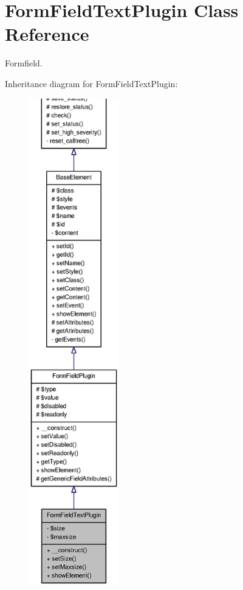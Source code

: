\section{FormFieldTextPlugin Class Reference}
\label{classFormFieldTextPlugin}


Formfield.  




Inheritance diagram for FormFieldTextPlugin:\nopagebreak
\begin{figure}[H]
\begin{center}
\leavevmode
\includegraphics[height=600pt]{classFormFieldTextPlugin__inherit__graph}
\end{center}
\end{figure}


